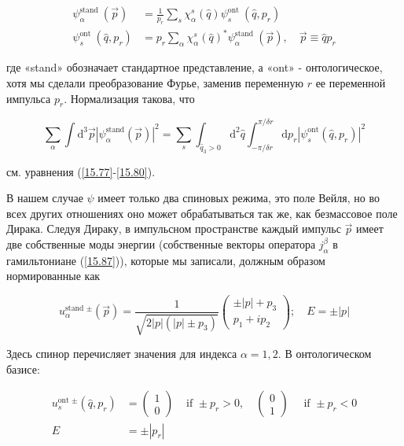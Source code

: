 \documentclass[main.tex]{subfiles}
\begin{document}
\begin{equation}\label{15.89}
	\begin{aligned}
\psi_{\alpha}^{\text {stand }}(\vec{p}) &=\frac{1}{p_{r}} \sum_{s} \chi_{\alpha}^{s}(\hat{q}) \psi_{s}^{\text {ont }}\left(\hat{q}, p_{r}\right) \\
\psi_{s}^{\text {ont }}\left(\hat{q}, p_{r}\right) &=p_{r} \sum_{\alpha} \chi_{\alpha}^{s}(\hat{q})^{*} \psi_{\alpha}^{\text {stand }}(\vec{p}), \quad \vec{p} \equiv \hat{q} p_{r}
\end{aligned}
\end{equation}
                          
где «stand» обозначает стандартное представление, а «ont» - онтологическое, хотя мы сделали преобразование Фурье, заменив переменную $r$ ее переменной импульса $p_r$. Нормализация такова, что

\begin{equation}\label{15.91}
	\sum_{\alpha} \int \mathrm{d}^{3} \vec{p}\left|\psi_{\alpha}^{\mathrm{stand}}(\vec{p})\right|^{2}=\sum_{s} \int_{\hat{q}_{3}>0} \mathrm{d}^{2} \hat{q} \int_{-\pi / \delta r}^{\pi / \delta r} \mathrm{d} p_{r}\left|\psi_{s}^{\mathrm{ont}}\left(\hat{q}, p_{r}\right)\right|^{2}
\end{equation}


см. уравнения (\ref{15.77}-\ref{15.80}).

В нашем случае $\psi$ имеет только два спиновых режима, это поле Вейля, но во всех других отношениях оно может обрабатываться так же, как безмассовое поле Дирака. Следуя Дираку, в импульсном пространстве каждый импульс $\vec p$ имеет две собственные моды энергии (собственные векторы оператора $j_\alpha^\beta$ в гамильтониане (\ref{15.87})), которые мы записали, должным образом нормированные как

\begin{equation}\label{15.92}
	u_{\alpha}^{\text {stand }\pm}(\vec{p})=\frac{1}{\sqrt{2|p|\left(|p| \pm p_{3}\right)}}\left(\begin{array}{c}
{\pm|p|+p_{3}} \\
{p_{1}+i p_{2}}
\end{array}\right) ; \quad E=\pm|p|
\end{equation}

Здесь спинор перечисляет значения для индекса $\alpha = 1,2$. В онтологическом базисе:

\begin{equation}\label{15.93}
	\begin{aligned}
u_{s}^{\text {ont } \pm}\left(\hat{q}, p_{r}\right) &=\left(\begin{array}{c}
{1} \\
{0}
\end{array}\right) & \text { if } \pm p_{r}>0, \quad\left(\begin{array}{l}
{0} \\
{1}
\end{array}\right) \quad \text { if } \pm p_{r}<0 \\
E &=\pm\left|p_{r}\right|
\end{aligned}
\end{equation}
\end{document}
